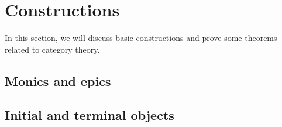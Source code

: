 \documentclass[../thesis.tex]{subfiles}
\begin{document}
\chapter{Constructions}

In this section, we will discuss basic constructions and prove some theorems related to category theory.

\section{Monics and epics}

\section{Initial and terminal objects}
\end{document}
